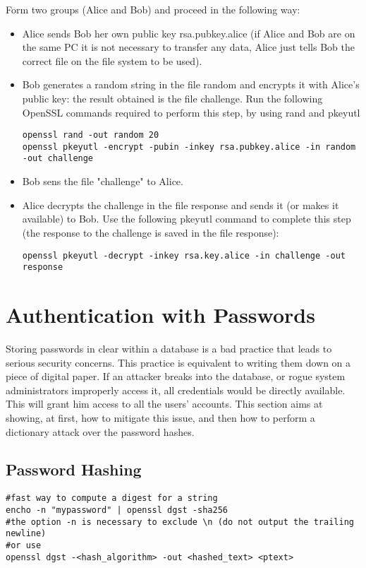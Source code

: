 Form two groups (Alice and Bob) and proceed in the following way:
\begin{itemize}
    \item Alice sends Bob her own public key rsa.pubkey.alice (if Alice and Bob are on the same PC it is not necessary to transfer any data, Alice just tells Bob the correct file on the file system to be used).
    \item Bob generates a random string in the file random and encrypts it with Alice’s public key: the result obtained is the file challenge. Run the following OpenSSL commands required to perform this step, by using rand and pkeyutl
    \begin{lstlisting}[style=bashStyle]
openssl rand -out random 20
openssl pkeyutl -encrypt -pubin -inkey rsa.pubkey.alice -in random -out challenge
    \end{lstlisting}
    \item Bob sens the file "challenge" to Alice.
    \item Alice decrypts the challenge in the file response and sends it (or makes it available) to Bob. Use the following pkeyutl command to complete this step (the response to the challenge is saved in the file response):
    \begin{lstlisting}[style=bashStyle]
openssl pkeyutl -decrypt -inkey rsa.key.alice -in challenge -out response
    \end{lstlisting}
\end{itemize}

\section{Authentication with Passwords}
Storing passwords in clear within a database is a bad practice that leads to serious security concerns. This
practice is equivalent to writing them down on a piece of digital paper. If an attacker breaks into the database,
or rogue system administrators improperly access it, all credentials would be directly available. This will grant
him access to all the users’ accounts. This section aims at showing, at first, how to mitigate this issue, and then
how to perform a dictionary attack over the password hashes.

\subsection{Password Hashing}
\begin{lstlisting}[style=bashStyle]
#fast way to compute a digest for a string
encho -n "mypassword" | openssl dgst -sha256
#the option -n is necessary to exclude \n (do not output the trailing newline)
#or use
openssl dgst -<hash_algorithm> -out <hashed_text> <ptext>

\end{lstlisting}

